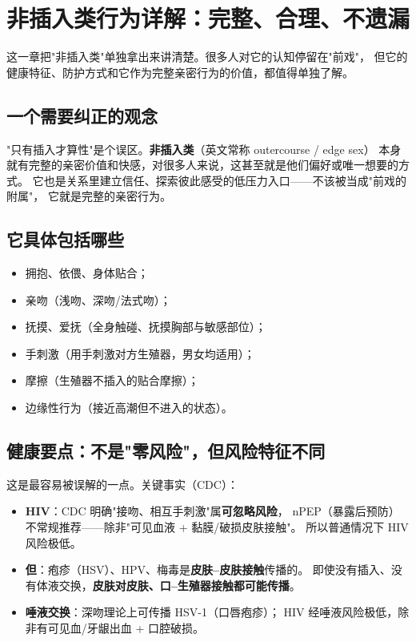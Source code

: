\documentclass[12pt,UTF8,openany]{ctexbook}
\begin{document}
\chapter{非插入类行为详解：完整、合理、不遗漏}
\label{chap:outer}

这一章把"非插入类"单独拿出来讲清楚。很多人对它的认知停留在"前戏"，
但它的健康特征、防护方式和它作为完整亲密行为的价值，都值得单独了解。

\section{一个需要纠正的观念}

"只有插入才算性"是个误区。\textbf{非插入类}（英文常称 outercourse / edge sex）
本身就有完整的亲密价值和快感，对很多人来说，这甚至就是他们偏好或唯一想要的方式。
它也是关系里建立信任、探索彼此感受的低压力入口——不该被当成"前戏的附属"，
它就是完整的亲密行为。

\section{它具体包括哪些}

\begin{itemize}[leftmargin=2em]
  \item 拥抱、依偎、身体贴合；
  \item 亲吻（浅吻、深吻/法式吻）；
  \item 抚摸、爱抚（全身触碰、抚摸胸部与敏感部位）；
  \item 手刺激（用手刺激对方生殖器，男女均适用）；
  \item 摩擦（生殖器不插入的贴合摩擦）；
  \item 边缘性行为（接近高潮但不进入的状态）。
\end{itemize}

\section{健康要点：不是"零风险"，但风险特征不同}

这是最容易被误解的一点。关键事实（CDC）：

\begin{itemize}[leftmargin=2em]
  \item \textbf{HIV}：CDC 明确"接吻、相互手刺激"属\textbf{可忽略风险}，
        nPEP（暴露后预防）不常规推荐——除非"可见血液 + 黏膜/破损皮肤接触"。
        所以普通情况下 HIV 风险极低。
  \item \textbf{但}：疱疹（HSV）、HPV、梅毒是\textbf{皮肤--皮肤接触}传播的。
        即使没有插入、没有体液交换，\textbf{皮肤对皮肤、口--生殖器接触都可能传播}。
  \item \textbf{唾液交换}：深吻理论上可传播 HSV-1（口唇疱疹）；
        HIV 经唾液风险极低，除非有可见血/牙龈出血 + 口腔破损。
\end{itemize}
\end{document}
